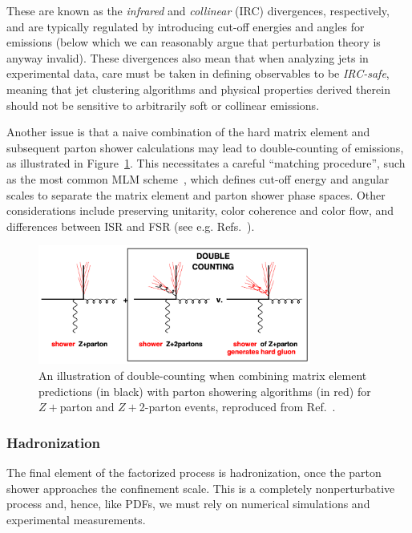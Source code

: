 These are known as the \textit{infrared} and \textit{collinear} (IRC) divergences, respectively, and are typically regulated by introducing cut-off energies and angles for emissions (below which we can reasonably argue that perturbation theory is anyway invalid).
These divergences also mean that when analyzing jets in experimental data, care must be taken in defining observables to be \textit{IRC-safe}, meaning that jet clustering algorithms and physical properties derived therein should not be sensitive to arbitrarily soft or collinear emissions.

Another issue is that a naive combination of the hard matrix element and subsequent parton shower calculations may lead to double-counting of emissions, as illustrated in Figure~\ref{fig:01_sm_qcd_doublecounting}.
This necessitates a careful ``matching procedure'', such as the most common MLM scheme~\cite{Alwall:2007fs}, which defines cut-off energy and angular scales to separate the matrix element and parton shower phase spaces.
Other considerations include preserving unitarity, color coherence and color flow, and differences between ISR and FSR (see e.g. Refs.~\cite{Hoche:2014rga, Hoche:2018Lecture}).

\begin{figure}[ht]
	\centering
	\includegraphics[width=0.8\textwidth]{figures/01-SM-03-SM/qcd/double_counting.png}
	\caption{An illustration of double-counting when combining matrix element predictions (in black) with parton showering algorithms (in red) for $Z+$parton and $Z+$2-parton events, reproduced from Ref.~\cite{Salam:2010zt}.}
	\label{fig:01_sm_qcd_doublecounting}
\end{figure}


\subsubsection{Hadronization}

The final element of the factorized process is hadronization, once the parton shower approaches the confinement scale.
This is a completely nonperturbative process and, hence, like PDFs, we must rely on numerical simulations and experimental measurements.

